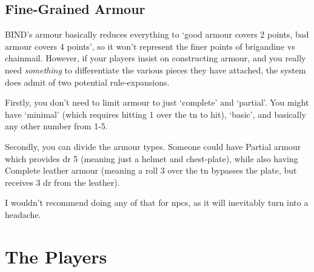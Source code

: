 \begin{multicols}{2}
\subsection{Fine-Grained Armour}

BIND's armour basically reduces everything to `good armour covers 2 points, bad armour covers 4 points', so it won't represent the finer points of brigandine vs chainmail.
However, if your players insist on constructing armour, and you really need \emph{something} to differentiate the various pieces they have attached, the system does admit of two potential rule-expansions.

Firstly, you don't need to limit armour to just `complete' and `partial'.
You might have `minimal' (which requires hitting 1 over the \gls{tn} to hit), `basic', and basically any other number from 1-5.

Secondly, you can divide the armour types.
Someone could have Partial armour which provides \gls{dr} 5 (meaning just a helmet and chest-plate), while also having Complete leather armour (meaning a roll 3 over the \gls{tn} bypasses the plate, but receives 3 \gls{dr} from the leather).

I wouldn't recommend doing any of that for \glspl{npc}, as it will inevitably turn into a headache.

\end{multicols}

\section{The Players}

